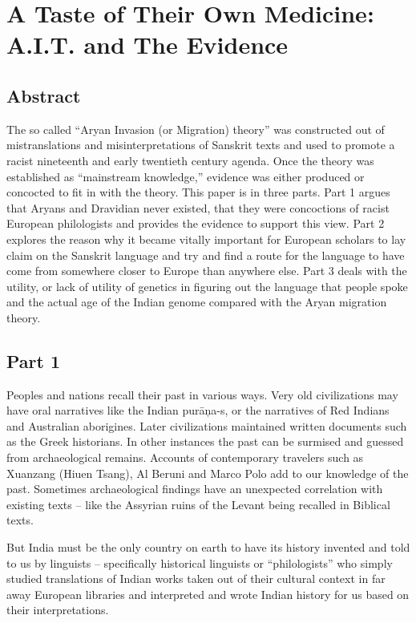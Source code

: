 
\chapter{A Taste of Their Own Medicine: A.I.T. and The Evidence}\label{chap07}



\section*{Abstract}

The so called “Aryan Invasion (or Migration) theory” was constructed out of mistranslations and misinterpretations of Sanskrit texts and used to promote a racist nineteenth and early twentieth century agenda. Once the theory was established as “mainstream knowledge,” evidence was either produced or concocted to fit in with the theory. This paper is in three parts. Part 1 argues that Aryans and Dravidian never existed, that they were concoctions of racist European philologists and provides the evidence to support this view. Part 2 explores the reason why it became vitally important for European scholars to lay claim on the Sanskrit language and try and find a route for the language to have come from somewhere closer to Europe than anywhere else. Part 3 deals with the utility, or lack of utility of genetics in figuring out the language that people spoke and the actual age of the Indian genome compared with the Aryan migration theory.


\section*{Part 1}

Peoples and nations recall their past in various ways. Very old civilizations may have oral narratives like the Indian purāņa-s, or the narratives of Red Indians and Australian aborigines. Later civilizations maintained written documents such as the Greek historians. In other instances the past can be surmised and guessed from archaeological remains. Accounts of contemporary travelers such as Xuanzang (Hiuen Tsang), Al Beruni and Marco Polo add to our knowledge of the past. Sometimes archaeological findings have an unexpected correlation with existing texts – like the Assyrian ruins of the Levant being recalled in Biblical texts.

But India must be the only country on earth to have its history invented and told to us by linguists – specifically historical linguists or “philologists” who simply studied translations of Indian works taken out of their cultural context in far away European libraries and interpreted and wrote Indian history for us based on their interpretations.

